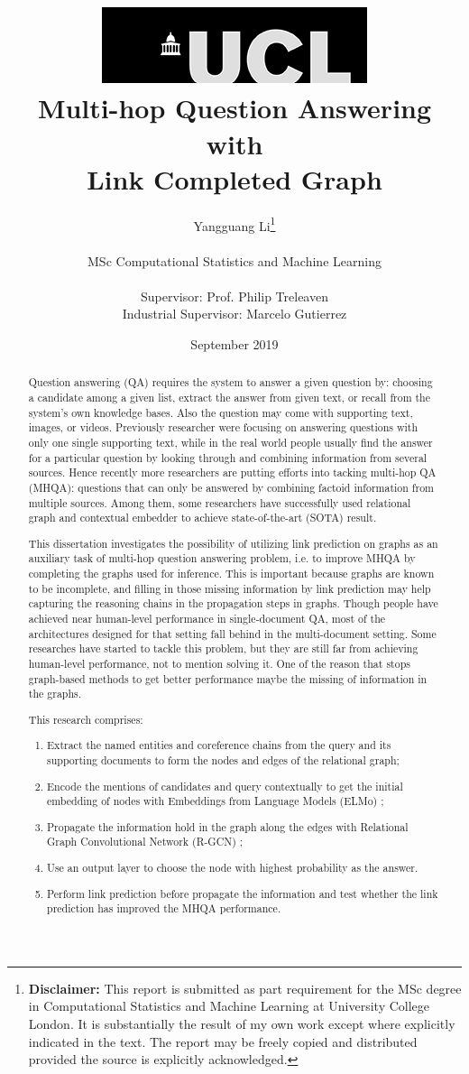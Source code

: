 \documentclass[12pt]{report}
\title{         { \includegraphics[scale=.5]{ucl_logo.png}}\\
{{\Huge \textbf{Multi-hop Question Answering with\\ Link Completed Graph}}}\\
                }
\date{September 2019}
\author{Yangguang Li\thanks{
{\bf Disclaimer:}
This report is submitted as part requirement for the MSc degree in Computational Statistics and Machine Learning at University College London. It is
substantially the result of my own work except where explicitly indicated in the text. The report may
be freely copied and distributed provided the source is explicitly acknowledged.}
\\ \\
MSc Computational Statistics and Machine Learning\\ \\
Supervisor: Prof. Philip Treleaven\\
Industrial Supervisor: Marcelo Gutierrez}
\begin{document}
 \onehalfspacing
\maketitle
\begin{abstract}
\begin{singlespace}
Question answering (QA) requires the system to answer a given question by: choosing a candidate among a given list, extract the answer from given text, or recall from the system's own knowledge bases. Also the question may come with supporting text, images, or videos. Previously researcher were focusing on answering questions with only one single supporting text, while in the real world people usually find the answer for a particular question by looking through and combining information from several sources. Hence recently more researchers are putting efforts into tacking multi-hop QA (MHQA): questions that can only be answered by combining factoid information from multiple sources. Among them, some researchers have successfully used relational graph and contextual embedder to achieve state-of-the-art (SOTA) result.

This dissertation investigates the possibility of utilizing link prediction on graphs as an auxiliary
task of multi-hop question answering problem, i.e. to improve MHQA by completing the graphs used
for inference. This is important because graphs are known to be incomplete, and filling in those missing information by link prediction may help capturing the reasoning chains in the propagation steps in graphs.
Though people have achieved near human-level performance in single-document QA, most of the architectures designed for that setting fall behind in the multi-document setting. Some researches have started to tackle this problem, but they are still far from achieving human-level performance, not to mention solving it. One of the reason that stops graph-based methods to get better performance maybe the missing of information in the graphs.

This research comprises:
\begin{enumerate}
\item Extract the named entities and coreference chains from the query and its supporting documents to form the nodes and edges of the relational graph;
\item Encode the mentions of candidates and query contextually to get the initial embedding of nodes with Embeddings from Language Models (ELMo) \cite{peters_deep_2018};
\item Propagate the information hold in the graph along the edges with Relational Graph Convolutional Network (R-GCN) \cite{schlichtkrull_modeling_2018};
\item Use an output layer to choose the node with highest probability as the answer.
\item Perform link prediction before propagate the information and test whether the link prediction has improved the MHQA performance.
\end{enumerate}


\end{singlespace}
\end{abstract}
\end{document}
